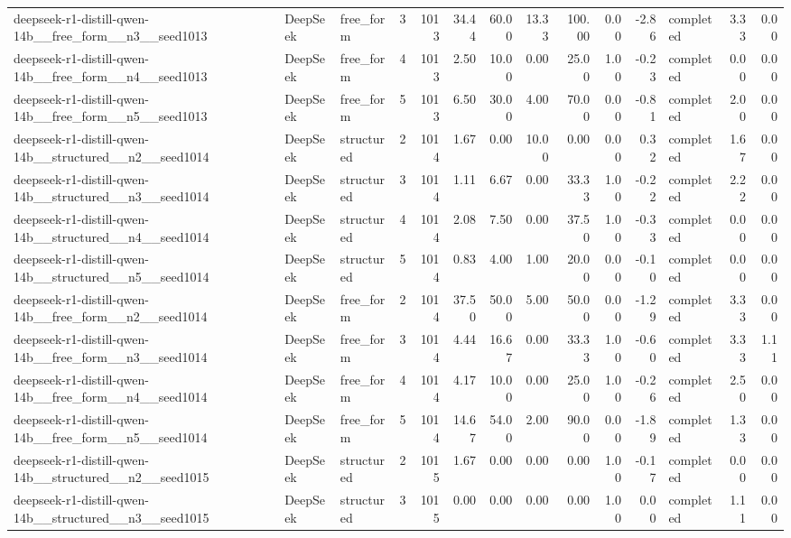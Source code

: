 \begin{longtable}{lllrrrrrrrrlrr}
deepseek-r1-distill-qwen-14b\_\_free\_form\_\_n3\_\_seed1013 & DeepSeek & free\_form & 3 & 1013 & 34.44 & 60.00 & 13.33 & 100.00 & 0.00 & -2.86 & completed & 3.33 & 0.00 \\
deepseek-r1-distill-qwen-14b\_\_free\_form\_\_n4\_\_seed1013 & DeepSeek & free\_form & 4 & 1013 & 2.50 & 10.00 & 0.00 & 25.00 & 1.00 & -0.23 & completed & 0.00 & 0.00 \\
deepseek-r1-distill-qwen-14b\_\_free\_form\_\_n5\_\_seed1013 & DeepSeek & free\_form & 5 & 1013 & 6.50 & 30.00 & 4.00 & 70.00 & 0.00 & -0.81 & completed & 2.00 & 0.00 \\
deepseek-r1-distill-qwen-14b\_\_structured\_\_n2\_\_seed1014 & DeepSeek & structured & 2 & 1014 & 1.67 & 0.00 & 10.00 & 0.00 & 0.00 & 0.32 & completed & 1.67 & 0.00 \\
deepseek-r1-distill-qwen-14b\_\_structured\_\_n3\_\_seed1014 & DeepSeek & structured & 3 & 1014 & 1.11 & 6.67 & 0.00 & 33.33 & 1.00 & -0.22 & completed & 2.22 & 0.00 \\
deepseek-r1-distill-qwen-14b\_\_structured\_\_n4\_\_seed1014 & DeepSeek & structured & 4 & 1014 & 2.08 & 7.50 & 0.00 & 37.50 & 1.00 & -0.33 & completed & 0.00 & 0.00 \\
deepseek-r1-distill-qwen-14b\_\_structured\_\_n5\_\_seed1014 & DeepSeek & structured & 5 & 1014 & 0.83 & 4.00 & 1.00 & 20.00 & 0.00 & -0.10 & completed & 0.00 & 0.00 \\
deepseek-r1-distill-qwen-14b\_\_free\_form\_\_n2\_\_seed1014 & DeepSeek & free\_form & 2 & 1014 & 37.50 & 50.00 & 5.00 & 50.00 & 0.00 & -1.29 & completed & 3.33 & 0.00 \\
deepseek-r1-distill-qwen-14b\_\_free\_form\_\_n3\_\_seed1014 & DeepSeek & free\_form & 3 & 1014 & 4.44 & 16.67 & 0.00 & 33.33 & 1.00 & -0.60 & completed & 3.33 & 1.11 \\
deepseek-r1-distill-qwen-14b\_\_free\_form\_\_n4\_\_seed1014 & DeepSeek & free\_form & 4 & 1014 & 4.17 & 10.00 & 0.00 & 25.00 & 1.00 & -0.26 & completed & 2.50 & 0.00 \\
deepseek-r1-distill-qwen-14b\_\_free\_form\_\_n5\_\_seed1014 & DeepSeek & free\_form & 5 & 1014 & 14.67 & 54.00 & 2.00 & 90.00 & 0.00 & -1.89 & completed & 1.33 & 0.00 \\
deepseek-r1-distill-qwen-14b\_\_structured\_\_n2\_\_seed1015 & DeepSeek & structured & 2 & 1015 & 1.67 & 0.00 & 0.00 & 0.00 & 1.00 & -0.17 & completed & 0.00 & 0.00 \\
deepseek-r1-distill-qwen-14b\_\_structured\_\_n3\_\_seed1015 & DeepSeek & structured & 3 & 1015 & 0.00 & 0.00 & 0.00 & 0.00 & 1.00 & 0.00 & completed & 1.11 & 0.00 \\

\end{longtable}
